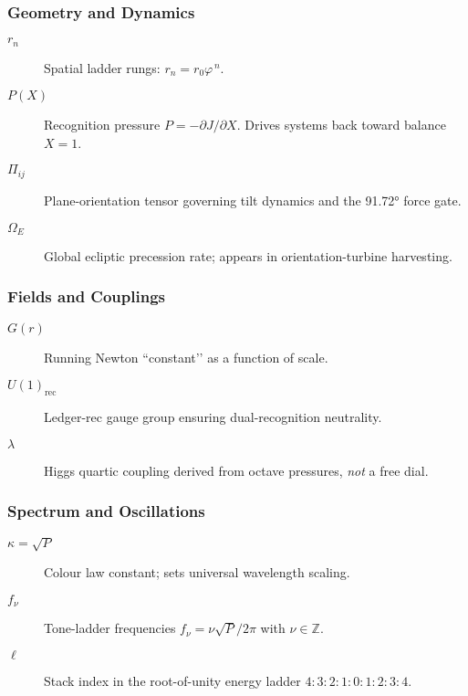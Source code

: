 \documentclass[11pt,oneside]{book}
\begin{document}
\subsubsection*{Geometry and Dynamics}
\begin{description}
\item[$r_n$] Spatial ladder rungs: \(r_n=r_0\varphi^{\,n}\).  
\item[$P(X)$] Recognition pressure
  \(P=-\partial J/\partial X\).  
  Drives systems back toward balance \(X=1\).
\item[$\Pi_{ij}$] Plane-orientation tensor governing tilt dynamics and
  the 91.72° force gate.
\item[$\Omega_E$] Global ecliptic precession rate; appears in
  orientation-turbine harvesting.
\end{description}

\subsubsection*{Fields and Couplings}
\begin{description}
\item[$G(r)$] Running Newton “constant’’ as a function of scale.  
\item[$U(1)_{\text{rec}}$] Ledger-rec gauge group ensuring
  dual-recognition neutrality.
\item[$\lambda$] Higgs quartic coupling derived from octave pressures,
  \emph{not} a free dial.
\end{description}

\subsubsection*{Spectrum and Oscillations}
\begin{description}
\item[$\kappa=\sqrt{P}$] Colour law constant; sets universal wavelength
  scaling.  
\item[$f_\nu$] Tone-ladder frequencies
  \(f_\nu=\nu\sqrt{P}/2\pi\) with \(\nu\in\mathbb Z\).
\item[$\ell$] Stack index in the root-of-unity energy ladder
  \(4:3:2:1:0:1:2:3:4\).
\end{description}
\end{document}

